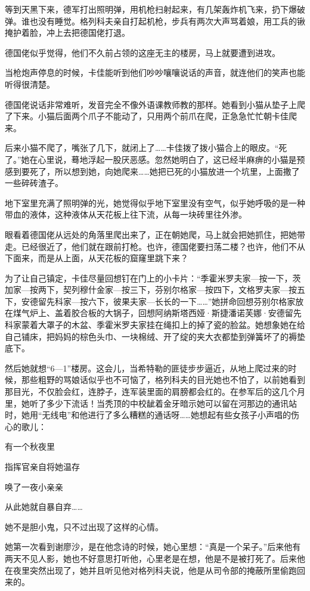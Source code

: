等到天黑下来，德军打出照明弹，用机枪扫射起来，有几架轰炸机飞来，扔下爆破弹。谁也没有睡觉。格列科夫亲自打起机枪，步兵有两次大声骂着娘，用工兵的锹掩护着脸，冲上去把德国佬打退。

德国佬似乎觉得，他们不久前占领的这座无主的楼房，马上就要遭到进攻。

当枪炮声停息的时候，卡佳能听到他们吵吵嚷嚷说话的声音，就连他们的笑声也能听得很清楚。

德国佬说话非常难听，发音完全不像外语课教师教的那样。她看到小猫从垫子上爬了下来。小猫后面两个爪子不能动了，只用两个前爪在爬，正急急忙忙朝卡佳爬来。

后来小猫不爬了，嘴张了几下，就闭上了……卡佳拨了拨小猫合上的眼皮。“死了。”她在心里说，蓦地浮起一股厌恶感。忽然她明白了，这已经半麻痹的小猫是预感到要死了，所以想到她，向她爬来……她把已死的小猫放进一个坑里，上面撒了一些碎砖渣子。

地下室里充满了照明弹的光，她觉得似乎地下室里没有空气，似乎她呼吸的是一种带血的液体，这种液体从天花板上往下流，从每一块砖里往外渗。

眼看着德国佬从远处的角落里爬出来了，正在朝她爬，马上就会把她抓住，把她带走。已经很近了，他们就在跟前打枪。也许，德国佬要扫荡二楼？也许，他们不从下面来，而是从上面，从天花板的窟窿里跳下来？

为了让自己镇定，卡佳尽量回想钉在门上的小卡片：“季霍米罗夫家—按一下，茨加家—按两下，契列穆什金家—按三下，芬别尔格家—按四下，文格罗夫家—按五下，安德留先科家—按六下，彼果夫家—长长的一下……”她拼命回想芬别尔格家放在煤气炉上、盖着胶合板的大锅子，回想阿纳斯塔西娅·斯捷潘诺芙娜·安德留先科家蒙着大罩子的木盆、季霍米罗夫家挂在绳扣上的掉了瓷的脸盆。她想象她在给自己铺床，把妈妈的棕色头巾、一块棉绒、开了绽的夹大衣都垫到弹簧坏了的褥垫底下。

然后她就想“6—1”楼房。这会儿，当希特勒的匪徒步步逼近，从地上爬过来的时候，那些粗野的骂娘话似乎也不可恼了，格列科夫的目光她也不怕了，以前她看到那目光，不仅脸会红，连脖子，连军装里面的肩膀都会红的。在参军后的这几个月里，她听了多少下流话！当秃顶的中校龇着金牙暗示她可以留在河那边的通讯站时，她用“无线电”和他进行了多么糟糕的通话呀……她想起有些女孩子小声唱的伤心的歌儿：

有一个秋夜里

指挥官亲自将她温存

唤了一夜小亲亲

从此她就自暴自弃……

她不是胆小鬼，只不过出现了这样的心情。

她第一次看到谢廖沙，是在他念诗的时候，她心里想：“真是一个呆子。”后来他有两天不见人影，她也不好意思打听他，心里老是在想，他是不是被打死了。后来他在夜里突然出现了，她并且听见他对格列科夫说，他是从司令部的掩蔽所里偷跑回来的。


